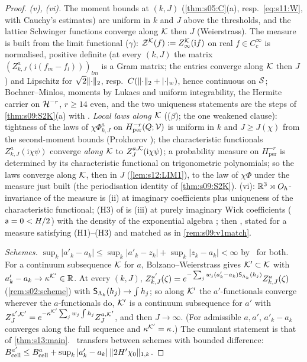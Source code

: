 \begin{proof}
\emph{(v), (vi).} The moment bounds at $(k,J)$ (\cref{thm:s05:C}(a), resp.\ \eqref{eq:s11:W}, with Cauchy's estimates) are uniform in $k$ and $J$ above the thresholds, and the lattice Schwinger functions converge along $\mathcal K$ then $J$ (Weierstrass). The measure is built from the limit functional ($\gamma$): $\mathcal Z^{\mathcal K}(f):=Z^{\mathcal K}_{\infty}(\mathrm if)$ on real $f\in C^\infty_c$ is normalised, positive definite (at every $(k,J)$ the matrix $(Z^a_{k,J}(\mathrm i(f_m-f_l)))_{lm}$ is a Gram matrix; the entries converge along $\mathcal K$ then $J$) and Lipschitz for $\sqrt2\lVert \cdot\rVert_2$, resp.\ $C(\lVert \cdot\rVert_2+\lvert \cdot\rvert_{w})$, hence continuous on $\mathcal S$; Bochner--Minlos, moments by Lukacs \cite{Luk70} and uniform integrability, the Hermite carrier on $\mathcal H^{-r}$, $r\ge14$ even, and the two uniqueness statements are the steps of \cref{thm:s09:S2K}(a) with \cite[Lemma~10.5(c), Lemma~10.3, Prop.~10.4]{SymPhase}. \emph{Local laws along $\mathcal K$} (($\beta$); the one weakened clause): tightness of the laws of $\chi\Phi^a_{k,J}$ on $H^{-r}_{\mathrm{per}}(Q;\mathcal V)$ is uniform in $k$ and $J\ge J(\chi)$ from the second-moment bounds (Prokhorov \cite{Bil99}); the characteristic functionals $Z^a_{k,J}(\mathrm i\chi\psi)$ converge \emph{along $\mathcal K$} to $Z^{a,\mathcal K}_J(\mathrm i\chi\psi)$; a probability measure on $H^{-r}_{\mathrm{per}}$ is determined by its characteristic functional on trigonometric polynomials; so the laws converge along $\mathcal K$, then in $J$ (\cref{lem:s12:LIM1}), to the law of $\chi\Phi$ under the measure just built (the periodisation identity of \cref{thm:s09:S2K}). (vi): $\mathbb R^3\rtimes O_h$-invariance of the measure is (ii) at imaginary coefficients plus uniqueness of the characteristic functional; (H3) of \cite{SymPhase} is (iii) at purely imaginary Wick coefficients ($\mathsf a=0<H/2$) with the density of the exponential algebra \cite[Lemma~J.2]{SymPhase}; then \cite[Thm.~10.10, Thm.~10.19, Thm.~10.20, Prop.~10.16, Cor.~10.43(iv), Thm.~10.12, Def.~2.12(iii)]{SymPhase}, stated for a measure satisfying (H1)--(H3) and matched as in \cref{rem:s09:v1match}.

\emph{Schemes.} $\sup_k|a'_k-a_k|\le\sup_k|a'_k-z_k|+\sup_k|z_k-a_k|<\infty$ by \SCH\ for both. For a continuum subsequence $\mathcal K$ for $a$, Bolzano--Weierstrass gives $\mathcal K'\subset\mathcal K$ with $a'_k-a_k\to\kappa^{\mathcal K'}\in\mathbb R$. At every $(k,J)$, $Z^{a'}_{k,J}(\zeta)=e^{-\sum_jw_j(a'_k-a_k)\mathsf S_{\Lambda_k}(h_j)}Z^a_{k,J}(\zeta)$ (\cref{rem:s02:scheme}) with $\mathsf S_{\Lambda_k}(h_j)\to\int h_j$; so along $\mathcal K'$ the $a'$-functionals converge wherever the $a$-functionals do, $\mathcal K'$ is a continuum subsequence for $a'$ with $Z^{a',\mathcal K'}_J=e^{-\kappa^{\mathcal K'}\sum_jw_j\int h_j}Z^{a,\mathcal K'}_J$, and then $J\to\infty$. (For admissible $a,a'$, $a'_k-a_k$ converges along the full sequence and $\kappa^{\mathcal K'}=\kappa$.) The cumulant statement is that of \cref{thm:s13:main}. \Bcell\ transfers between schemes with bounded difference: $B^{a'}_{\mathrm{cell}}\le B^a_{\mathrm{cell}}+\sup_k|a'_k-a_k|\,\lVert 2H'\chi_0\rVert_{1,k}$.


\end{proof}
